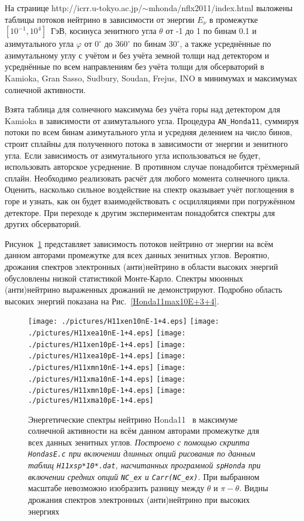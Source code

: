 На странице http://icrr.u-tokyo.ac.jp/$\sim$mhonda/nflx2011/index.html выложены таблицы потоков нейтрино в зависимости от энергии $E_{\nu}$ в промежутке $[10^{-1},10^{4}]$~ГэВ, косинуса зенитного угла $\theta$ от -1 до 1 по бинам 0.1 и азимутального угла $\varphi$ от $0^{\circ}$ до $360^{\circ}$ по бинам $30^{\circ}$, а также усреднённые по азимутальному углу с учётом и без учёта земной толщи над детектором и усреднённые по всем направлениям без учёта толщи для обсерваторий в Kamioka, Gran Sasso, Sudbury, Soudan, Frejus, INO в минимумах и максимумах солнечной активности.

\newpage
{\color{blue}Взята таблица для солнечного максимума без учёта горы над детектором для Kamioka в зависимости от азимутального угла.} Процедура \texttt{AN\_Honda11}, суммируя потоки по всем бинам азимутального угла и усредняя делением на число бинов, строит сплайны для полученного потока в зависимости от энергии и зенитного угла. {\color{MYgreen}Если зависимость от азимутального угла использоваться не будет, использовать авторское усреднение. В противном случае понадобится трёхмерный сплайн. Необходимо реализовать расчёт для любого момента солнечного цикла. Оценить, насколько сильное воздействие на спектр оказывает учёт {\color{red}поглощения в горе} и {\color{red}узнать}, как он будет взаимодействовать с осцилляциями при {\color{red}погружённом детекторе}. При переходе к другим экспериментам понадобятся спектры для других обсерваторий.}

Рисунок~\ref{Honda11max10E-1+4} представляет зависимость потоков нейтрино от энергии на всём данном авторами промежутке для всех данных зенитных углов. Вероятно, дрожания спектров электронных (анти)нейтрино в области высоких энергий обусловлены низкой статистикой Монте-Карло. Спектры мюонных (анти)нейтрино выраженных дрожаний не демонстрируют. Подробно область высоких энергий показана на Рис.~\ref{Honda11max10E+3+4}.
\begin{figure}[!ht]
\texttt{[image: ./pictures/H11xen10nE-1+4.eps]}
\texttt{[image: ./pictures/H11xea10nE-1+4.eps]}
\texttt{[image: ./pictures/H11xen10pE-1+4.eps]}
\texttt{[image: ./pictures/H11xea10pE-1+4.eps]}
\texttt{[image: ./pictures/H11xmn10nE-1+4.eps]}
\texttt{[image: ./pictures/H11xma10nE-1+4.eps]}
\texttt{[image: ./pictures/H11xmn10pE-1+4.eps]}
\texttt{[image: ./pictures/H11xma10pE-1+4.eps]}
\caption{Энергетические спектры нейтрино Honda11~\cite{Honda:2011nf} в максимуме солнечной активности на всём данном авторами промежутке для всех данных зенитных углов. \textit{Построено с помощью скрипта \texttt{HondasE.c} при включении длинных опций рисования по данным таблиц \texttt{H11xsp*10*.dat}, насчитанных программой \texttt{spHonda} при включении средних опций \texttt{NC\_ex} и \texttt{Carr(NC\_ex)}.} При выбранном масштабе невозможно изобразить разницу между $\theta$ и $\pi-\theta$. Видны дрожания спектров электронных (анти)нейтрино при высоких энергиях}
\label{Honda11max10E-1+4}
\end{figure}

